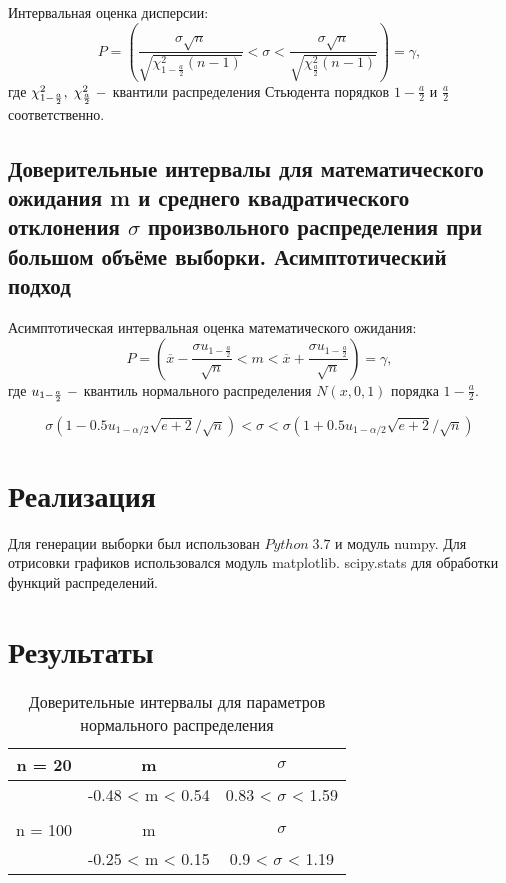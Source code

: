 \documentclass[a4]{article}
\begin{document}
		Интервальная оценка дисперсии:
		$$
		P=\left(\frac{\sigma\sqrt{n}}{\sqrt{\chi^2_{1-\frac{a}{2}}(n-1)}}<\sigma<\frac{\sigma\sqrt{n}}{\sqrt{\chi^2_\frac{a}{2}(n-1)}}\right) = \gamma,
		$$
		где $\chi_{1-\frac{a}{2}}^2,\;\chi_\frac{a}{2}^2\;\--$ квантили распределения Стьюдента порядков $1-\frac{a}{2}$ и $\frac{a}{2}$ соответственно.
		\subsection{Доверительные интервалы для математического ожидания m и среднего квадратического отклонения $\sigma$ произвольного распределения при большом объёме выборки. Асимптотический подход}
		
		Асимптотическая интервальная оценка математического ожидания:
		$$P = \left(\overline{x}-\frac{\sigma u_{1-\frac{a}{2}}}{\sqrt{n}}<m<\overline{x}+\frac{\sigma u_{1-\frac{a}{2}}}{\sqrt{n}}\right)=\gamma,
		$$
		где $u_{1-\frac{a}{2}}\;\--$ квантиль нормального распределения $N(x,0,1)$ порядка $1-\frac{a}{2}.$
		
		$$\sigma(1 - 0.5u_{1 - \alpha/2} \sqrt{e + 2}/ \sqrt{n}) < \sigma < \sigma(1 + 0.5u_{1 - \alpha/2} \sqrt{e + 2}/ \sqrt{n})$$
		
	\section{Реализация}
	Для генерации выборки был использован $Python\;3.7$ и модуль numpy. Для отрисовки графиков использовался модуль matplotlib. scipy.stats для обработки функций распределений.
	
	\section{Результаты}
		\begin{table}[h!]
			
			\caption{Доверительные интервалы для параметров нормального распределения}
			\label{tab:my_label}
			\begin{center}
				\vspace{5mm}
				
				\begin{tabular}{|c|c|c|}
					\hline
					n = 20 & m & $\sigma$\\
					\hline
					& -0.48 < m < 0.54 & 0.83 < $\sigma$ < 1.59\\ 
					\hline
					& &\\
					\hline
					n = 100 & m & $\sigma$\\
					\hline
					& -0.25 < m < 0.15 & 0.9 < $\sigma$ < 1.19\\
					\hline
				\end{tabular}
			\end{center}
		\end{table}
		
\end{document}

